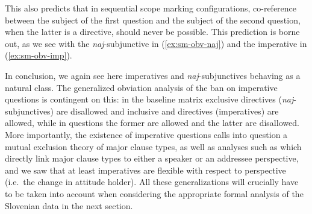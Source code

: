 \documentclass[output=paper,colorlinks,citecolor=brown]{langscibook}
\begin{document}
This also predicts that in sequential scope marking configurations, co-reference between the subject of the first question and the subject of the second question, when the latter is a directive, should never be possible. This prediction is borne out, as we see with the \emph{naj}-subjunctive in (\ref{ex:sm-obv-naj}) and the imperative in (\ref{ex:sm-obv-imp}). 
\ea {} 
\z\z     

\noindent In conclusion, we again see here imperatives and \emph{naj}-subjunctives behaving as a natural class. The generalized obviation analysis of the ban on imperative questions is contingent on this: in the baseline matrix exclusive \fst{} directives (\emph{naj}-subjunctives) are disallowed and inclusive \fst{} and \snd{} directives (imperatives) are allowed, while in questions the former are allowed and the latter are disallowed. More importantly, the existence of imperative questions calls into question a mutual exclusion theory of major clause types, as well as analyses such as  which directly link major clause types to either a speaker or an addressee perspective, and we saw that at least imperatives are flexible with respect to perspective (i.e.\ the change in attitude holder). All these generalizations will crucially have to be taken into account when considering the appropriate formal analysis of the Slovenian data in the next section.      
   
    
\end{document}
